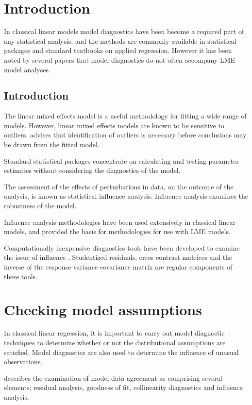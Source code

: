 \documentclass[12pt, a4paper]{article}
\begin{document}
	



\section{Introduction}%
In classical linear models model diagnostics have been become a required part of any statistical analysis, and the methods are commonly available in statistical packages and standard textbooks on applied regression. However it has been noted by several papers that model diagnostics do not often accompany LME model analyses.
\subsection{Introduction }
The linear mixed effects model is a useful methodology for fitting a wide range of models. However, linear mixed effects models are known to be sensitive to outliers. \citet{christensen} advises that identification of outliers is necessary before conclusions may be drawn from the fitted model.

Standard statistical packages concentrate on calculating and testing parameter estimates without considering the diagnostics of the model.

The assessment of the effects of perturbations in data, on the outcome of the analysis, is known as statistical influence analysis. Influence analysis examines the robustness of the model.

Influence analysis methodologies have been used extensively in classical linear models, and provided the basis for methodologies for use with LME models.

Computationally inexpensive diagnostics tools have been developed to examine the issue of influence \citep{tewomir}.
Studentized residuals, error contrast matrices and the inverse of the response variance covariance matrix are regular components of these tools.
\section{Checking model assumptions}
In classical linear regression, it is important to carry out model diagnostic techniques to determine whether or not the distributional assumptions are satisfied. Model diagnostics are also used to determine the influence of unusual observations.

\citet{schabenberger} describes the examination of model-data agreement as comprising several elements; residual analysis, goodness of fit, collinearity diagnostics and influence analysis.
\end{document}
